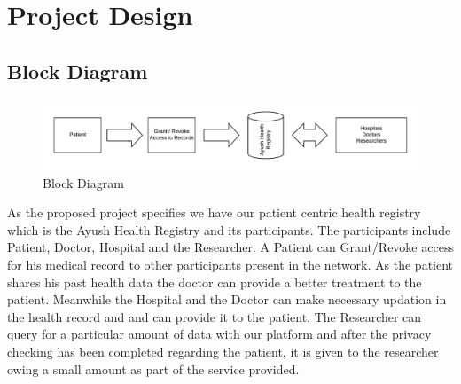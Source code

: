 \documentclass[11pt]{report}
\begin{document}
\chapter{Project Design}
\section{Block Diagram}
    \begin{figure}[h!]
        \centering
        \includegraphics[scale=0.8]{Block.jpeg}
        \caption{Block Diagram}
        \label{fig:my_label}
    \end{figure}
    As the proposed project specifies we have our patient centric health registry which is the Ayush Health Registry and its participants. The participants include Patient, Doctor, Hospital and the Researcher. A Patient can Grant/Revoke access for his medical record to other participants present in the network. As the patient shares his past health data the doctor can provide a better treatment to the patient. Meanwhile the Hospital and the Doctor can make necessary updation in the health record and and can provide it to the patient. The Researcher can query for a particular amount of data with our platform and after the privacy checking has been completed regarding the patient, it is given to the researcher owing a small amount as part of the service provided.
    \newpage
\end{document}

